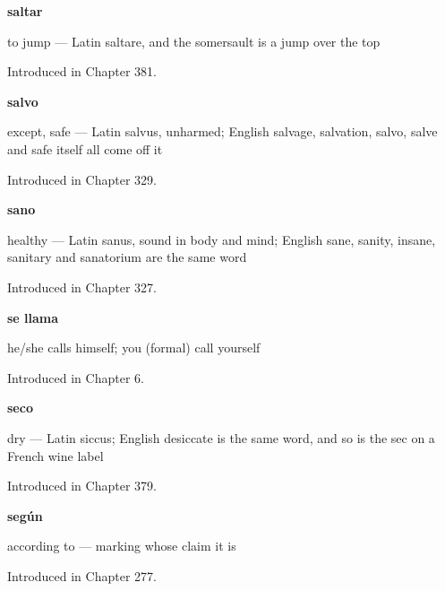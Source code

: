 \noindent\begin{minipage}[t]{\linewidth}
\raggedright
\textbf{saltar}\par
\small to jump — Latin saltare, and the somersault is a jump over the top\par
\footnotesize Introduced in Chapter 381.
\end{minipage}\par\medskip

\noindent\begin{minipage}[t]{\linewidth}
\raggedright
\textbf{salvo}\par
\small except, safe — Latin salvus, unharmed; English salvage, salvation, salvo, salve and safe itself all come off it\par
\footnotesize Introduced in Chapter 329.
\end{minipage}\par\medskip

\noindent\begin{minipage}[t]{\linewidth}
\raggedright
\textbf{sano}\par
\small healthy — Latin sanus, sound in body and mind; English sane, sanity, insane, sanitary and sanatorium are the same word\par
\footnotesize Introduced in Chapter 327.
\end{minipage}\par\medskip

\noindent\begin{minipage}[t]{\linewidth}
\raggedright
\textbf{se llama}\par
\small he/she calls himself; you (formal) call yourself\par
\footnotesize Introduced in Chapter 6.
\end{minipage}\par\medskip

\noindent\begin{minipage}[t]{\linewidth}
\raggedright
\textbf{seco}\par
\small dry — Latin siccus; English desiccate is the same word, and so is the sec on a French wine label\par
\footnotesize Introduced in Chapter 379.
\end{minipage}\par\medskip

\noindent\begin{minipage}[t]{\linewidth}
\raggedright
\textbf{según}\par
\small according to — marking whose claim it is\par
\footnotesize Introduced in Chapter 277.
\end{minipage}\par\medskip

